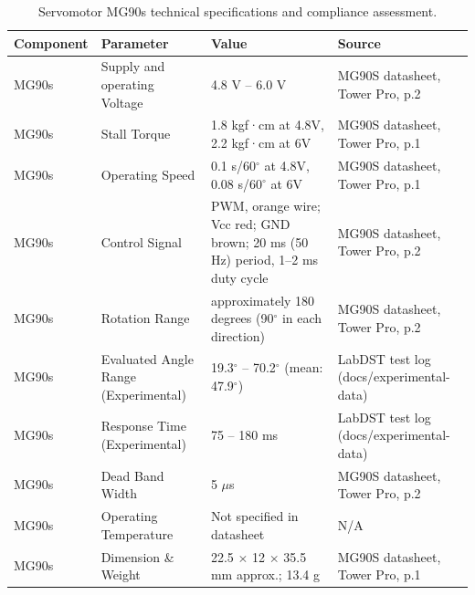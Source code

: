 \documentclass[lettersize,journal]{IEEEtran}
\begin{document}
\begin{table}[ht]
	\centering
	\caption{Servomotor MG90s technical specifications and compliance assessment.}
	\label{tab:MG90s}
	\scriptsize
	\renewcommand{\arraystretch}{1.2}
	\begin{tabular}{|p{1.2cm}|p{2.1cm}|p{1.8cm}|p{2.1cm}|}
		\hline
		\textbf{Component} &
		\textbf{Parameter} &
		\textbf{Value} &
		\textbf{Source}\\
		\hline
		
		MG90s &
		Supply and operating Voltage  &
		4.8 V – 6.0 V &
		MG90S datasheet, Tower Pro, p.2 \\
		\hline
		
		MG90s &
		Stall Torque &
		1.8 kgf·cm at 4.8V, 2.2 kgf·cm at 6V &
		MG90S datasheet, Tower Pro, p.1\\
		\hline
		
		MG90s &
		Operating Speed &
		0.1 s/60$^\circ$ at 4.8V, 0.08 s/60$^\circ$ at 6V &
		MG90S datasheet, Tower Pro, p.1\\
		\hline
		
		MG90s &
		Control Signal &
		PWM, orange wire; Vcc red; GND brown; 20 ms (50 Hz) period, 1--2 ms duty cycle &
		MG90S datasheet, Tower Pro, p.2\\
		\hline
		
		MG90s &
		Rotation Range &
		approximately 180 degrees (90$^\circ$ in each direction) &
		MG90S datasheet, Tower Pro, p.2\\
		\hline
		
		MG90s &
		Evaluated Angle Range (Experimental) &
		19.3$^\circ$ -- 70.2$^\circ$ (mean: 47.9$^\circ$) &
		LabDST test log (docs/experimental-data) \\
		\hline
		
		MG90s &
		Response Time (Experimental) &
		75 -- 180 ms &
		LabDST test log (docs/experimental-data) \\
		\hline
		
		MG90s &
		Dead Band Width &
		5 $\mu$s &
		MG90S datasheet, Tower Pro, p.2\\
		\hline
		
		MG90s &
		Operating Temperature &
		Not specified in datasheet &
		N/A\\
		\hline
		
		MG90s &
		Dimension \& Weight &
		22.5 $\times$ 12 $\times$ 35.5 mm approx.; 13.4 g &
		MG90S datasheet, Tower Pro, p.1\\
		\hline
		
	\end{tabular}
\end{table}
\end{document}
